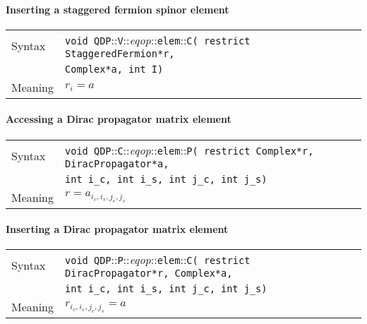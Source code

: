 \documentclass[12pt,letterpaper]{article}
\newcommand{\tComplex}{Complex}
\newcommand{\tStaggeredFermion}{StaggeredFermion}
\newcommand{\tDiracPropagator}{DiracPropagator}
\newcommand{\namespace}{QDP}
\newcommand{\ttdash}{{::}}
\newcommand{\extraarg}{}
\begin{document}
\paragraph{Inserting a staggered fermion spinor element}

\begin{flushleft}
  \begin{tabular}{|l|l|}
  \hline
  Syntax      & {\tt void \namespace}\ttdash{\tt V}\ttdash{\it eqop}\ttdash{\tt elem}\ttdash{\tt C( restrict \tStaggeredFermion *r,}\\
              & {\tt \tComplex *a, int I\extraarg)} \\
  \hline
  Meaning     & $r_i = a$\\
  \hline
  \end{tabular}
\end{flushleft}

\paragraph{Accessing a Dirac propagator matrix element}

\begin{flushleft}
  \begin{tabular}{|l|l|}
  \hline
  Syntax      & {\tt void \namespace}\ttdash{\tt C}\ttdash{\it eqop}\ttdash{\tt elem}\ttdash{\tt P( restrict \tComplex *r, \tDiracPropagator *a,} \\
              & {\tt int i\_c, int i\_s, int j\_c, int j\_s\extraarg)} \\
  \hline
  Meaning     & $r = a_{i_c,i_s,j_c,j_s}$\\
  \hline
  \end{tabular}
\end{flushleft}

\paragraph{Inserting a Dirac propagator matrix element}

\begin{flushleft}
  \begin{tabular}{|l|l|}
  \hline
  Syntax      & {\tt void \namespace}\ttdash{\tt P}\ttdash{\it eqop}\ttdash{\tt elem}\ttdash{\tt C( restrict \tDiracPropagator *r, \tComplex *a,} \\
              & {\tt int i\_c, int i\_s, int j\_c, int j\_s\extraarg)} \\
  \hline
  Meaning     & $r_{i_c,i_s,j_c,j_s} = a$\\
  \hline
  \end{tabular}
\end{flushleft}
\end{document}
